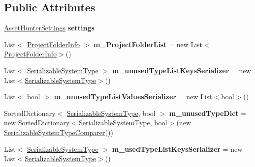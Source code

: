\subsection*{Public Attributes}
\begin{DoxyCompactItemize}
\item 
\mbox{\label{class_asset_hunter_main_window_a41fd800952772f4390cc87fe016ffd60}} 
\hyperlink{class_heureka_games_1_1_asset_hunter_settings}{Asset\+Hunter\+Settings} {\bfseries settings}
\item 
\mbox{\label{class_asset_hunter_main_window_a22dfd28e61502681555c88d47ce9b763}} 
List$<$ \hyperlink{class_heureka_games_1_1_project_folder_info}{Project\+Folder\+Info} $>$ {\bfseries m\+\_\+\+Project\+Folder\+List} = new List$<$\hyperlink{class_heureka_games_1_1_project_folder_info}{Project\+Folder\+Info}$>$()
\item 
\mbox{\label{class_asset_hunter_main_window_aec7095a8c08db5d77816135fe03a1811}} 
List$<$ \hyperlink{class_heureka_games_1_1_serializable_system_type}{Serializable\+System\+Type} $>$ {\bfseries m\+\_\+unused\+Type\+List\+Keys\+Serializer} = new List$<$\hyperlink{class_heureka_games_1_1_serializable_system_type}{Serializable\+System\+Type}$>$()
\item 
\mbox{\label{class_asset_hunter_main_window_a889df0c3f382d194ec36f6353a39b0ce}} 
List$<$ bool $>$ {\bfseries m\+\_\+unused\+Type\+List\+Values\+Serializer} = new List$<$bool$>$()
\item 
\mbox{\label{class_asset_hunter_main_window_abead668b551d1e9663457eda236a5d42}} 
Sorted\+Dictionary$<$ \hyperlink{class_heureka_games_1_1_serializable_system_type}{Serializable\+System\+Type}, bool $>$ {\bfseries m\+\_\+unused\+Type\+Dict} = new Sorted\+Dictionary$<$\hyperlink{class_heureka_games_1_1_serializable_system_type}{Serializable\+System\+Type}, bool$>$(new \hyperlink{class_heureka_games_1_1_serializable_system_type_comparer}{Serializable\+System\+Type\+Comparer}())
\item 
\mbox{\label{class_asset_hunter_main_window_aefba7472c967fd59534dc7480a288866}} 
List$<$ \hyperlink{class_heureka_games_1_1_serializable_system_type}{Serializable\+System\+Type} $>$ {\bfseries m\+\_\+used\+Type\+List\+Keys\+Serializer} = new List$<$\hyperlink{class_heureka_games_1_1_serializable_system_type}{Serializable\+System\+Type}$>$()

\end{DoxyCompactItemize}
